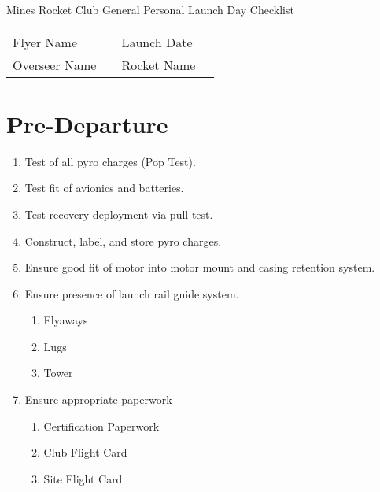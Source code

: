 \documentclass[12pt]{article}
\begin{document}
\pagestyle{fancy}
{\centering \Large Mines Rocket Club General Personal Launch Day Checklist}\newline
\begin{tabular}{lclc}
	Flyer Name    & \framebox[50mm]{\rule{0pt}{10mm}} & Launch Date & \framebox[50mm]{\rule{0pt}{10mm}}\\
	Overseer Name & \framebox[50mm]{\rule{0pt}{10mm}} & Rocket Name & \framebox[50mm]{\rule{0pt}{10mm}}\\
\end{tabular}
\section{Pre-Departure}
\begin{addmargin}[3em]{3em}
	\begin{enumerate}[label=\thesection.\arabic*\quad$\square$]
		\item Test of all pyro charges (Pop Test).
		\item Test fit of avionics and batteries.
		\item Test recovery deployment via pull test.
		\item Construct, label, and store pyro charges.
		\item Ensure good fit of motor into motor mount and casing retention system.
		\item Ensure presence of launch rail guide system.
		\begin{enumerate} [label=\thesection.\arabic{enumi}.\arabic*\quad$\square$]
			\item Flyaways
			\item Lugs
			\item Tower
		\end{enumerate}
		\item Ensure appropriate paperwork
		\begin{enumerate} [label=\thesection.\arabic{enumi}.\arabic*\quad$\square$]
			\item Certification Paperwork
			\item Club Flight Card
			\item Site Flight Card
		\end{enumerate}
	\end{enumerate}
\end{addmargin}
\end{document}
